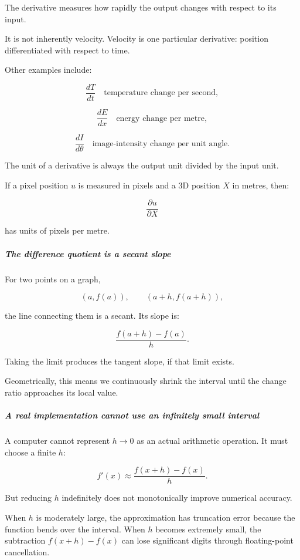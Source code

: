 The derivative measures how rapidly the output changes with respect to its input.

It is not inherently velocity. Velocity is one particular derivative: position differentiated with respect to time.

Other examples include:

\[
\frac{dT}{dt} \quad\text{temperature change per second},
\]

\[
\frac{dE}{dx} \quad\text{energy change per metre},
\]

\[
\frac{dI}{d\theta} \quad\text{image-intensity change per unit angle}.
\]

The unit of a derivative is always the output unit divided by the input unit.

If a pixel position \(u\) is measured in pixels and a 3D position \(X\) in metres, then:

\[
\frac{\partial u}{\partial X}
\]

has units of pixels per metre.

\subparagraph{The difference quotient is a secant slope}\label{01-foundations-i-ch020-the-difference-quotient-is-a-secant-slope}

For two points on a graph,

\[
(a,f(a)),\qquad(a+h,f(a+h)),
\]

the line connecting them is a secant. Its slope is:

\[
\frac{f(a+h)-f(a)}h.
\]

Taking the limit produces the tangent slope, if that limit exists.

Geometrically, this means we continuously shrink the interval until the change ratio approaches its local value.

\subparagraph{A real implementation cannot use an infinitely small interval}\label{01-foundations-i-ch020-a-real-implementation-cannot-use-an-infinitely-small-interval}

A computer cannot represent \(h\to0\) as an actual arithmetic operation. It must choose a finite \(h\):

\[
f'(x)\approx\frac{f(x+h)-f(x)}h.
\]

But reducing \(h\) indefinitely does not monotonically improve numerical accuracy.

When \(h\) is moderately large, the approximation has truncation error because the function bends over the interval. When \(h\) becomes extremely small, the subtraction \(f(x+h)-f(x)\) can lose significant digits through floating-point cancellation.

